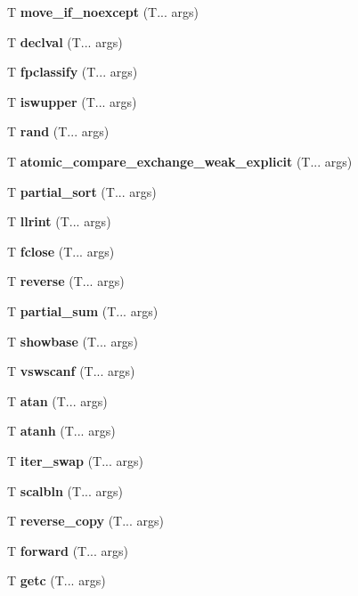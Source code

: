 \begin{DoxyCompactItemize}
T \textbf{ move\+\_\+if\+\_\+noexcept} (T... args)
\item 
\mbox{\label{declval}} 
T \textbf{ declval} (T... args)
\item 
\mbox{\label{fpclassify}} 
T \textbf{ fpclassify} (T... args)
\item 
\mbox{\label{iswupper}} 
T \textbf{ iswupper} (T... args)
\item 
\mbox{\label{rand}} 
T \textbf{ rand} (T... args)
\item 
\mbox{\label{atomic_compare_exchange}} 
T \textbf{ atomic\+\_\+compare\+\_\+exchange\+\_\+weak\+\_\+explicit} (T... args)
\item 
\mbox{\label{partial_sort}} 
T \textbf{ partial\+\_\+sort} (T... args)
\item 
\mbox{\label{rint}} 
T \textbf{ llrint} (T... args)
\item 
\mbox{\label{fclose}} 
T \textbf{ fclose} (T... args)
\item 
\mbox{\label{reverse}} 
T \textbf{ reverse} (T... args)
\item 
\mbox{\label{partial_sum}} 
T \textbf{ partial\+\_\+sum} (T... args)
\item 
\mbox{\label{showbase}} 
T \textbf{ showbase} (T... args)
\item 
\mbox{\label{vfwscanf}} 
T \textbf{ vswscanf} (T... args)
\item 
\mbox{\label{atan}} 
T \textbf{ atan} (T... args)
\item 
\mbox{\label{atanh}} 
T \textbf{ atanh} (T... args)
\item 
\mbox{\label{iter_swap}} 
T \textbf{ iter\+\_\+swap} (T... args)
\item 
\mbox{\label{scalbn}} 
T \textbf{ scalbln} (T... args)
\item 
\mbox{\label{reverse_copy}} 
T \textbf{ reverse\+\_\+copy} (T... args)
\item 
\mbox{\label{forward}} 
T \textbf{ forward} (T... args)
\item 
\mbox{\label{fgetc}} 
T \textbf{ getc} (T... args)
\item 
\mbox{\label{equal_range}} 

\end{DoxyCompactItemize}
